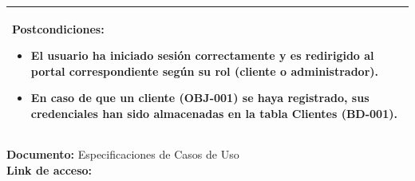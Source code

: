 \begin{longtable}{|p{15cm}|}
\textbf{Postcondiciones:}
\begin{itemize}
\item El usuario ha iniciado sesión correctamente y es redirigido al portal correspondiente según su rol (cliente o administrador).
\item En caso de que un cliente (OBJ-001) se haya registrado, sus credenciales han sido almacenadas en la tabla Clientes (BD-001).
\end{itemize} \\
\hline

\end{longtable}
\textbf{Documento:} Especificaciones de Casos de Uso \\
\textbf{Link de acceso:} \linkDiagramaEspecificacionesCasoDeUso \\

